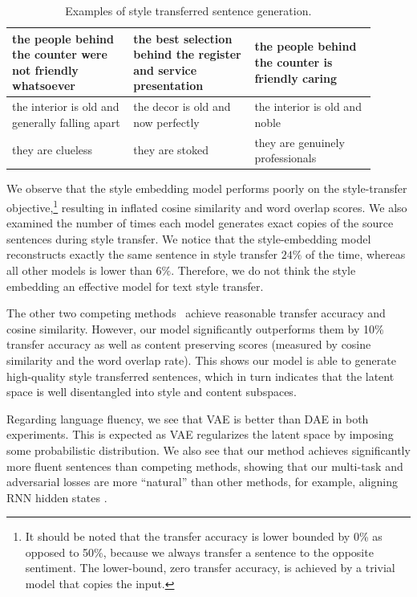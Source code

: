 \documentclass[letterpaper]{article} %
\begin{document}
\begin{table}[ht]
\begin{tabular}{| p{0.3\linewidth} || p{0.3\linewidth} | p{0.3\linewidth} |}
		the people behind the counter were not friendly whatsoever              & the best selection behind the register and service presentation           & the people behind the counter is friendly caring           \\
		\hline
		the interior is old and generally falling apart                         & the decor is old and now perfectly                                        & the interior is old and noble                              \\
		\hline
		they are clueless                                                       & they are stoked                                                           & they are genuinely professionals                           \\
		\hline
	\end{tabular}
	\caption{Examples of style transferred sentence generation.}
	\label{tab:transfer-samples}
\end{table}

We observe that the style embedding model \cite{fu2018style} performs poorly on the style-transfer objective,\footnote{It should be noted that the transfer accuracy is lower bounded by 0\% as opposed to 50\%, because we always transfer a sentence to the opposite sentiment. The lower-bound, zero transfer accuracy, is achieved by a trivial model that copies the input.} resulting in inflated cosine similarity and word overlap scores. We also examined the number of times each model generates exact copies of the source sentences during style transfer. We notice that the style-embedding model reconstructs exactly the same sentence in style transfer $24\%$ of the time, whereas all other models is lower than $6\%$. Therefore, we do not think the style embedding an effective model for text style transfer.

The other two competing methods~\cite{shen2017style,zhao2018adversarially} achieve reasonable transfer accuracy and cosine similarity. However, our model significantly outperforms them by 10\% transfer accuracy as well as content preserving scores (measured by cosine similarity and the word overlap rate). This shows our model is able to generate high-quality style transferred sentences, which in turn indicates that the  latent space  is well disentangled into style and content subspaces.

Regarding language fluency, we see that VAE is better than DAE in both experiments. This is expected as VAE regularizes the latent space by imposing some probabilistic distribution. We also see that our method achieves significantly more fluent sentences than competing methods, showing that our multi-task and adversarial losses are more ``natural'' than other methods, for example, aligning RNN hidden states \cite{shen2017style}.
\end{document}
